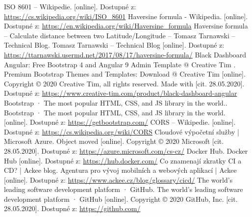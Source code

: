 \documentclass[
  glossaries,
]{kidiplom}
\begin{document}
\begin{thebibliography}{9}
     ISO 8601 – Wikipedie. [online]. Dostupné z: \url{https://cs.wikipedia.org/wiki/ISO\_8601}
     Haversine formula - Wikipedia. [online]. Dostupné z: \url{https://en.wikipedia.org/wiki/Haversine\_formula}
     Haversine formula – Calculate distance between two Latitude/Longitude – Tomasz Tarnawski – Technical Blog. Tomasz Tarnawski – Technical Blog [online]. Dostupné z: \url{https://ttarnawski.usermd.net/2017/08/17/haversine-formula/}
     Black Dashboard Angular: Free Bootstrap 4 and Angular 9 Admin Template @ Creative Tim . Premium Bootstrap Themes and Templates: Download @ Creative Tim [online]. Copyright © 2020 Creative Tim, all rights reserved. Made with [cit. 28.05.2020]. Dostupné z:  \url{https://www.creative-tim.com/product/black-dashboard-angular}
     Bootstrap · The most popular HTML, CSS, and JS library in the world.. Bootstrap · The most popular HTML, CSS, and JS library in the world. [online]. Dostupné z: \url{https://getbootstrap.com/}
     CORS – Wikipedie. [online]. Dostupné z:  \url{https://cs.wikipedia.org/wiki/CORS}
     Cloudové výpočetní služby | Microsoft Azure. Object moved [online]. Copyright © 2020 Microsoft [cit. 28.05.2020]. Dostupné z: \url{https://azure.microsoft.com/cs-cz/}
     Docker Hub. Docker Hub [online]. Dostupné z: \url{https://hub.docker.com/}
     Co znamenají zkratky CI a CD? | Ackee blog. Agentura pro vývoj mobilních a webových aplikací | Ackee [online]. Dostupné z: \url{https://www.ackee.cz/blog/glossary/cicd/}
     The world’s leading software development platform · GitHub. The world’s leading software development platform · GitHub [online]. Copyright © 2020 GitHub, Inc. [cit. 28.05.2020]. Dostupné z: \url{https://github.com/}
\end{thebibliography}

\newpage
\end{document}
